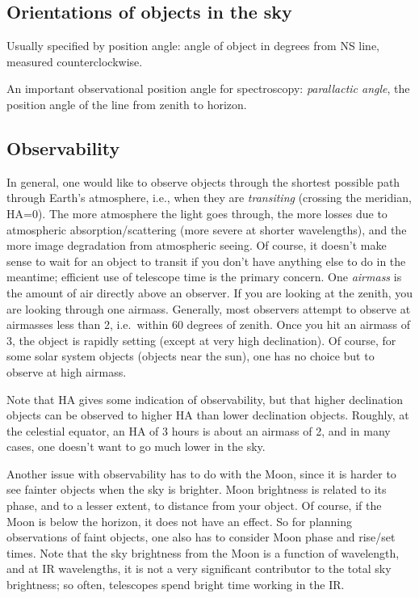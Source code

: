 \documentclass{article}
\begin{document}
\subsection*{Orientations of objects in the sky}
Usually specified by position angle: angle of object in degrees from NS line,
measured counterclockwise.

An important observational position angle for spectroscopy:
\emph{parallactic angle}, the position angle of the line from zenith to
horizon.

\subsection*{Observability}
In general, one would like to observe objects through the shortest
possible path through Earth's atmosphere, i.e., when they are \emph{transiting}
(crossing the meridian, HA=0). The more atmosphere the light goes through,
the more losses due to atmospheric absorption/scattering (more severe at
shorter wavelengths), and the more image degradation from atmospheric seeing.
Of course, it doesn't make sense to wait for an object to transit if you
don't have anything else to do in the meantime; efficient use of telescope time
is the primary concern.
One \emph{airmass} is the amount of air directly above an observer.
If you are looking at the zenith, you are looking through one airmass.
Generally, most observers attempt to observe at airmasses
less than 2, i.e.\ within 60 degrees of zenith. Once you hit an airmass
of 3, the object is rapidly setting (except at very high declination).
Of course, for some solar system objects (objects near the sun), one has no
choice but to observe at high airmass.

Note that HA gives some indication of observability, but that
higher declination objects can be observed to higher HA than lower
declination objects. Roughly, at the celestial equator, an HA of 3 hours
is about an airmass of 2, and in many cases, one doesn't want to go much
lower in the sky.

Another issue with observability has to do with the Moon,
since it is harder to see fainter objects when the sky is brighter.
Moon brightness is related to its phase, and to a lesser extent, to
distance from your object. Of course, if the Moon is below the horizon,
it does not have an effect. So for planning observations of faint objects,
one also has to consider Moon phase and rise/set times. Note that the
sky brightness from the Moon is a function of wavelength, and at IR
wavelengths, it is not a very significant contributor to the total sky
brightness; so often, telescopes spend bright time working in the IR.
\end{document}
